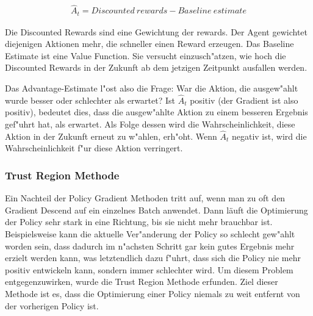 \documentclass[12pt,a4paper]{article}
\begin{document}
\begin{eqnarray}
\hat{A}_{t} = Discounted\: rewards - Baseline\: estimate
\end{eqnarray}

Die Discounted Rewards sind eine Gewichtung der rewards. Der Agent gewichtet diejenigen Aktionen mehr, die schneller einen Reward erzeugen.
Das Baseline Estimate ist eine Value Function. Sie versucht einzusch"atzen, wie hoch die Discounted Rewards in der Zukunft ab dem jetzigen Zeitpunkt ausfallen werden.

Das Advantage-Estimate l"ost also die Frage: War die Aktion, die ausgew"ahlt wurde besser oder schlechter als erwartet?
Ist $\hat{A}_{t}$ positiv (der Gradient ist also positiv), bedeutet dies, dass die ausgew"ahlte Aktion zu einem besseren Ergebnis gef"uhrt hat, als erwartet.
Als Folge dessen wird die Wahrscheinlichkeit, diese Aktion in der Zukunft erneut zu w"ahlen, erh"oht.
Wenn $\hat{A}_{t}$ negativ ist, wird die Wahrscheinlichkeit f"ur diese Aktion verringert.

\subsubsection{Trust Region Methode}
Ein Nachteil der Policy Gradient Methoden tritt auf, wenn man zu oft den Gradient Descend auf ein einzelnes Batch anwendet. Dann läuft die Optimierung der Policy sehr stark in eine Richtung, bis sie nicht mehr brauchbar ist. Beispielsweise kann die aktuelle Ver"anderung der Policy so schlecht gew"ahlt worden sein, dass dadurch im n"achsten Schritt gar kein gutes Ergebnis mehr erzielt werden kann, was letztendlich dazu f"uhrt, dass sich die Policy nie mehr positiv entwickeln kann, sondern immer schlechter wird.
\newline
Um diesem Problem entgegenzuwirken, wurde die Trust Region Methode erfunden. Ziel dieser Methode ist es, dass die Optimierung einer Policy niemals zu weit entfernt von der vorherigen Policy ist.
\end{document}
